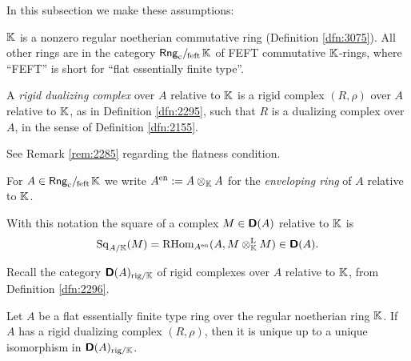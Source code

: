 \label{subsec:rig-res-cplx-rng}

In this subsection we make these assumptions:

\begin{setup} \label{set:3210}
$\mathbb{K}$ is a nonzero regular noetherian commutative ring (Definition 
\ref{dfn:3075}). All other rings are in the 
category $\mathrm{\mathsf{Rng}}_{\mathrm{c}} /_{\mspace{-2mu} \mathrm{feft}} \mspace{2mu} \mathbb{K}$ of FEFT commutative $\mathbb{K}$-rings, where 
``FEFT'' is short for ``flat essentially finite type''. 
\end{setup}

\begin{dfn} \label{dfn:2530}
A {\em rigid dualizing complex}%
over $A$ relative to $\mathbb{K}$ is a rigid complex 
$(R, \rho)$ over $A$ relative to $\mathbb{K}$, as in Definition \ref{dfn:2295}, such 
that $R$ is a dualizing complex over $A$, in the sense of Definition 
\ref{dfn:2155}.
\end{dfn}

See Remark \ref{rem:2285} regarding the flatness condition. 

\begin{dfn} \label{dfn:4200}
For $A \in \mathrm{\mathsf{Rng}}_{\mathrm{c}} /_{\mspace{-2mu} \mathrm{feft}} \mspace{2mu} \mathbb{K}$ we write  
$A^{\mathrm{en}} := A \otimes_{\mathbb{K}} A$ for the 
{\em enveloping ring}%
%
of $A$ relative to $\mathbb{K}$.
\end{dfn}

With this notation the square of a complex $M \in \boldsymbol{\mathsf{D}}(A)$ relative to $\mathbb{K}$ 
is 
\[ \operatorname{Sq}_{A / \mathbb{K}}(M) = 
\operatorname{RHom}_{A^{\mathrm{en}}}(A, M \otimes^{\mathrm{L}}_{\mathbb{K}} M)
\in \boldsymbol{\mathsf{D}}(A)  . \]

Recall the category $\boldsymbol{\mathsf{D}}(A)_{\mathrm{rig} / \mathbb{K}}$ of rigid complexes over 
$A$ relative to $\mathbb{K}$, from Definition \ref{dfn:2296}. 

\begin{thm}[Uniqueness] \label{thm:2280}
Let $A$ be a flat essentially finite type ring over the regular noetherian ring 
$\mathbb{K}$. If $A$ has a rigid dualizing complex $(R, \rho)$, then it is 
unique up to a unique isomorphism in $\boldsymbol{\mathsf{D}}(A)_{\mathrm{rig} / \mathbb{K}}$. 
\end{thm}

